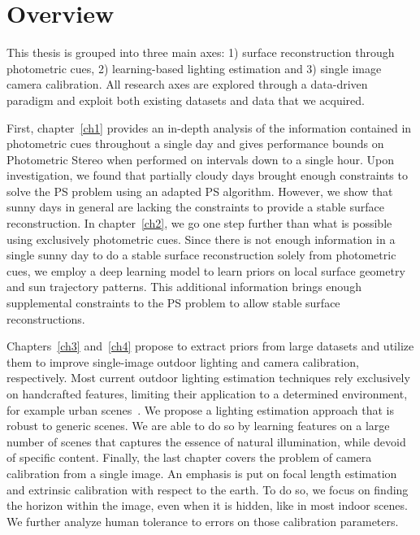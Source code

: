 \section*{Overview}

This thesis is grouped into three main axes: 1) surface reconstruction through photometric cues, 2) learning-based lighting estimation and 3) single image camera calibration. All research axes are explored through a data-driven paradigm and exploit both existing datasets and data that we acquired. 

First, chapter~\ref{ch1} provides an in-depth analysis of the information contained in photometric cues throughout a single day and gives performance bounds on Photometric Stereo when performed on intervals down to a single hour. Upon investigation, we found that partially cloudy days brought enough constraints to solve the PS problem using an adapted PS algorithm. However, we show that sunny days in general are lacking the constraints to provide a stable surface reconstruction. In chapter~\ref{ch2}, we go one step further than what is possible using exclusively photometric cues. Since there is not enough information in a single sunny day to do a stable surface reconstruction solely from photometric cues, we employ a deep learning model to learn priors on local surface geometry and sun trajectory patterns. This additional information brings enough supplemental constraints to the PS problem to allow stable surface reconstructions. 

Chapters~\ref{ch3} and~\ref{ch4} propose to extract priors from large datasets and utilize them to improve single-image outdoor lighting and camera calibration, respectively. Most current outdoor lighting estimation techniques rely exclusively on handcrafted features, limiting their application to a determined environment, for example urban scenes~\cite{lalonde-ijcv-12}. We propose a lighting estimation approach that is robust to generic scenes. We are able to do so by learning features on a large number of scenes that captures the essence of natural illumination, while devoid of specific content. Finally, the last chapter covers the problem of camera calibration from a single image. An emphasis is put on focal length estimation and extrinsic calibration with respect to the earth. To do so, we focus on finding the horizon within the image, even when it is hidden, like in most indoor scenes. We further analyze human tolerance to errors on those calibration parameters. 



%
%

